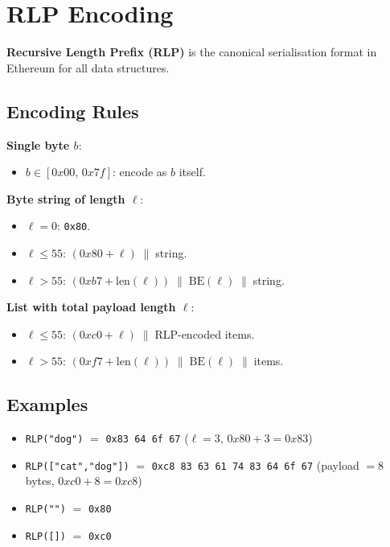 \documentclass[12pt,a4paper,openany]{book}
\theoremstyle{definition}
\theoremstyle{plain}
\theoremstyle{remark}
\begin{document}
\section{RLP Encoding}

\textbf{Recursive Length Prefix (RLP)} is the canonical serialisation
format in Ethereum for all data structures.

\subsection{Encoding Rules}

\textbf{Single byte $b$}:
\begin{itemize}
  \item $b\in[0x00,\,0x7f]$: encode as $b$ itself.
\end{itemize}

\textbf{Byte string of length $\ell$}:
\begin{itemize}
  \item $\ell=0$: \texttt{0x80}.
  \item $\ell\leq 55$: $(0x80+\ell)\;\|\;$string.
  \item $\ell>55$: $(0xb7+\text{len}(\ell))\;\|\;\text{BE}(\ell)\;\|\;$string.
\end{itemize}

\textbf{List with total payload length $\ell$}:
\begin{itemize}
  \item $\ell\leq 55$: $(0xc0+\ell)\;\|\;$RLP-encoded items.
  \item $\ell>55$: $(0xf7+\text{len}(\ell))\;\|\;\text{BE}(\ell)\;\|\;$items.
\end{itemize}

\subsection{Examples}

\begin{itemize}
  \item \texttt{RLP("dog")} $=$ \texttt{0x83 64 6f 67}
        \quad ($\ell=3$, $0x80+3=0x83$)
  \item \texttt{RLP(["cat","dog"])} $=$ \texttt{0xc8 83 63 61 74 83 64 6f 67}
        \quad (payload $=8$ bytes, $0xc0+8=0xc8$)
  \item \texttt{RLP("")} $=$ \texttt{0x80}
  \item \texttt{RLP([])} $=$ \texttt{0xc0}
\end{itemize}
\end{document}
